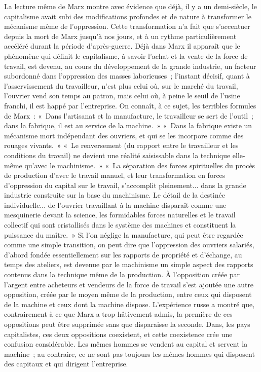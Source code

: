\documentclass[french,twoside]{book} %
\begin{document}
\noindent La lecture même de Marx montre avec évidence que déjà, il y a un demi-siècle, le capitalisme avait subi des modifications profondes et de nature à transformer le mécanisme même de l'oppression. Cette transformation n'a fait que s'accentuer depuis la mort de Marx jusqu'à nos jours, et à un rythme particulièrement accéléré durant la période d'après-guerre. Déjà dans Marx il apparaît que le phénomène qui définit le capitalisme, à savoir l'achat et la vente de la force de travail, est devenu, au cours du développement de la grande industrie, un facteur subordonné dans l'oppression des masses laborieuses ; l'instant décisif, quant à l'asservissement du travailleur, n'est plus celui où, sur le marché du travail, l'ouvrier vend son temps au patron, mais celui où, à peine le seuil de l'usine franchi, il est happé par l'entreprise. On connaît, à ce sujet, les terribles formules de Marx : « Dans l'artisanat et la manufacture, le travailleur se sert de l'outil ; dans la fabrique, il est au service de la machine. » « Dans la fabrique existe un mécanisme mort indépendant des ouvriers, et qui se les incorpore comme des rouages vivants. » « Le renversement (du rapport entre le travailleur et les conditions du travail) ne devient une réalité saisissable dans la technique elle-même qu'avec le machinisme. » « La séparation des forces spirituelles du procès de production d'avec le travail manuel, et leur transformation en forces d'oppression du capital sur le travail, s'accomplit pleinement... dans la grande industrie construite sur la base du machinisme. Le détail de la destinée individuelle... de l'ouvrier travaillant à la machine disparaît comme une mesquinerie devant la science, les formidables forces naturelles et le travail collectif qui sont cristallisés dans le système des machines et constituent la puissance du maître. » Si l'on néglige la manufacture, qui peut être regardée comme une simple transition, on peut dire que l'oppression des ouvriers salariés, d'abord fondée essentiellement sur les rapports de propriété et d'échange, au temps des ateliers, est devenue par le machinisme un simple aspect des rapports contenus dans la technique même de la production. À l'opposition créée par l'argent entre acheteurs et vendeurs de la force de travail s'est ajoutée une autre opposition, créée par le moyen même de la production, entre ceux qui disposent de la machine et ceux dont la machine dispose. L'expérience russe a montré que, contrairement à ce que Marx a trop hâtivement admis, la première de ces oppositions peut être supprimée sans que disparaisse la seconde. Dans, les pays capitalistes, ces deux oppositions coexistent, et cette coexistence crée une confusion considérable. Les mêmes hommes se vendent au capital et servent la machine ; au contraire, ce ne sont pas toujours les mêmes hommes qui disposent des capitaux et qui dirigent l'entreprise.\par
\end{document}

